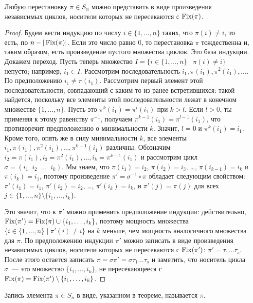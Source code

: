 \begin{theorem}
Любую перестановку $\pi\in S_n$ можно представить в виде произведения
независимых циклов, носители которых не пересекаются с $\operatorname{Fix}(\pi)$.
\end{theorem}
\begin{proof}
Будем вести индукцию по числу $i\in\{1,\dots,n\}$ таких, что
$\pi(i)\neq i$, то есть, по $n-|\operatorname{Fix}(\pi)|$.
Если это число равно $0$, то перестановка $\pi$
тождественна и, таким образом, есть произведение пустого множества
циклов. Это база индукции. Докажем переход.
Пусть теперь множество $I = \{i\in\{1,\dots,n\}\mid \pi(i)\neq i\}$
непусто; например, $i_1\in I$. Рассмотрим последовательность
$i_1,\pi(i_1),\pi^2(i_1),\dots$. По предположению
$i_1\neq\pi(i_1)$. Рассмотрим первый элемент этой последовательности,
совпадающий с каким-то из ранее встретившихся: такой найдется,
поскольку все элементы этой последовательности лежат в конечном
множестве $\{1,\dots,n\}$. Пусть это $\pi^k(i_1) =
\pi^l(i_1)$ при $k>l$. Если $l>0$, ты применяя к этому равенству
$\pi^{-1}$, получаем $\pi^{k-1}(i_1) = \pi^{l-1}(i_1)$, что
противоречит предположению о минимальности $k$. Значит,
$l=0$ и $\pi^k(i_1) = i_1$. Кроме того, опять же в силу минимальности
$k$, все элементы $i_1,\pi(i_1),\pi^2(i_1),\dots,\pi^{k-1}(i_1)$
различны. Обозначим
$i_2=\pi(i_1),i_3=\pi^2(i_1),\dots,i_k=\pi^{k-1}(i_1)$ и рассмотрим
цикл $\sigma=(i_1\;\;i_2\;\;\dots\;\;i_k)$. Мы знаем, что
$\pi(i_1)=i_2$, $\pi(i_2)=i_3$, \dots, $\pi(i_{k-1})=i_k$ и
$\pi(i_k) = i_1$, поэтому произведение
$\pi' = \sigma^{-1}\circ\pi$ обладает следующим свойством:
$\pi'(i_1) = i_1$, $\pi'(i_2) = i_2$, \dots, $\pi'(i_k) = i_k$,
и $\pi'(j)=\pi(j)$ для всех
$j\in\{1,\dots,n\}\setminus\{i_1,\dots,i_k\}$.

Это значит, что к $\pi'$ можно применить предположение индукции:
действительно, $\operatorname{Fix}(\pi') = \operatorname{Fix}(\pi)\cup\{i_1,\dots,i_k\}$, поэтому
мощность множества $\{i\in\{1,\dots,n\}\mid \pi'(i)\neq i\}$ на $k$
меньше, чем мощность аналогичного множества для $\pi$.
По предположению индукции $\pi'$ можно записать в виде произведения
независимых циклов, носители которых не пересекаются с $\operatorname{Fix}(\pi')$:
$\pi' = \tau_1\dots\tau_s$. После этого остается записать
$\pi = \sigma\pi' = \sigma\tau_1\dots\tau_s$ и заметить, что носитель
цикла $\sigma$~--- это множество $\{i_1,\dots,i_k\}$, не
пересекающееся с $\operatorname{Fix}(\pi) = \operatorname{Fix}(\pi')\setminus\{i_1,\dots,i_k\}$.
\end{proof}

\begin{definition}
Запись элемента $\pi\in S_n$ в виде, указанном в теореме,
называется  $\pi$.
\end{definition}

